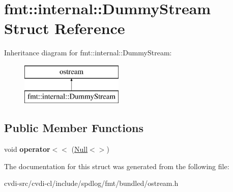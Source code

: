 \hypertarget{structfmt_1_1internal_1_1DummyStream}{}\section{fmt\+:\+:internal\+:\+:Dummy\+Stream Struct Reference}
\label{structfmt_1_1internal_1_1DummyStream}
Inheritance diagram for fmt\+:\+:internal\+:\+:Dummy\+Stream\+:\begin{figure}[H]
\begin{center}
\leavevmode
\includegraphics[height=2.000000cm]{structfmt_1_1internal_1_1DummyStream}
\end{center}
\end{figure}
\subsection*{Public Member Functions}
\begin{DoxyCompactItemize}
\item 
void {\bfseries operator$<$$<$} (\hyperlink{structfmt_1_1internal_1_1Null}{Null}$<$$>$)\hypertarget{structfmt_1_1internal_1_1DummyStream_a42f21ef25da7abaa29821b7d5fc4e2d6}{}\label{structfmt_1_1internal_1_1DummyStream_a42f21ef25da7abaa29821b7d5fc4e2d6}

\end{DoxyCompactItemize}


The documentation for this struct was generated from the following file\+:\begin{DoxyCompactItemize}
\item 
cvdi-\/src/cvdi-\/cl/include/spdlog/fmt/bundled/ostream.\+h\end{DoxyCompactItemize}
